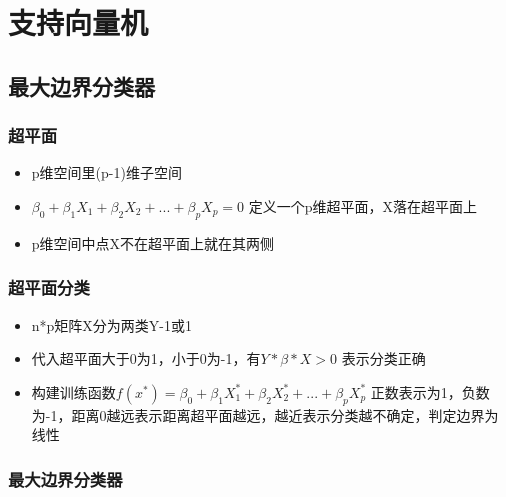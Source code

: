 \documentclass[]{book}
\providecommand{\tightlist}{%
  \setlength{\itemsep}{0pt}\setlength{\parskip}{0pt}}
\begin{document}
\hypertarget{ux652fux6301ux5411ux91cfux673a}{%
\section{支持向量机}\label{ux652fux6301ux5411ux91cfux673a}}

\hypertarget{ux6700ux5927ux8fb9ux754cux5206ux7c7bux5668}{%
\subsection{最大边界分类器}\label{ux6700ux5927ux8fb9ux754cux5206ux7c7bux5668}}

\hypertarget{ux8d85ux5e73ux9762}{%
\subsubsection{超平面}\label{ux8d85ux5e73ux9762}}

\begin{itemize}
\tightlist
\item
  p维空间里(p-1)维子空间
\item
  \(\beta_0 + \beta_1 X_1 + \beta_2 X_2 + ... + \beta_p X_p = 0\) 定义一个p维超平面，X落在超平面上
\item
  p维空间中点X不在超平面上就在其两侧
\end{itemize}

\hypertarget{ux8d85ux5e73ux9762ux5206ux7c7b}{%
\subsubsection{超平面分类}\label{ux8d85ux5e73ux9762ux5206ux7c7b}}

\begin{itemize}
\tightlist
\item
  n*p矩阵X分为两类Y-1或1
\item
  代入超平面大于0为1，小于0为-1，有\(Y*\beta*X > 0\) 表示分类正确
\item
  构建训练函数\(f(x^*) = \beta_0 + \beta_1 X_1^* + \beta_2 X_2^* + ... + \beta_p X_p^*\) 正数表示为1，负数为-1，距离0越远表示距离超平面越远，越近表示分类越不确定，判定边界为线性
\end{itemize}

\hypertarget{ux6700ux5927ux8fb9ux754cux5206ux7c7bux5668-1}{%
\subsubsection{最大边界分类器}\label{ux6700ux5927ux8fb9ux754cux5206ux7c7bux5668-1}}
\end{document}
